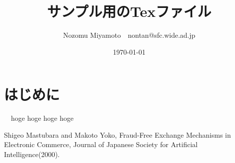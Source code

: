 \documentclass[twocolumn, a4j]{article}
\title{サンプル用のTexファイル}
\author{Nozomu Miyamoto\footnotemark[2]　nontan@sfc.wide.ad.jp}
\date{\today}
\renewcommand{\thefootnote}{\fnsymbol{footnote}}
\renewcommand{\thefootnote}{\arabic{footnote}}
\begin{document}

\renewcommand{\thefootnote}{\fnsymbol{footnote}}
\renewcommand{\thefootnote}{\arabic{footnote}}

\section{はじめに}

  　hoge hoge hoge hoge

\renewcommand{\refname}{参考文献}
\begin{thebibliography}{数字}
   Shigeo Mastubara and Makoto Yoko, Fraud-Free Exchange Mechanisms in Electronic Commerce, Journal of Japanese Society for Artificial Intelligence(2000).
\end{thebibliography}
\end{document}
